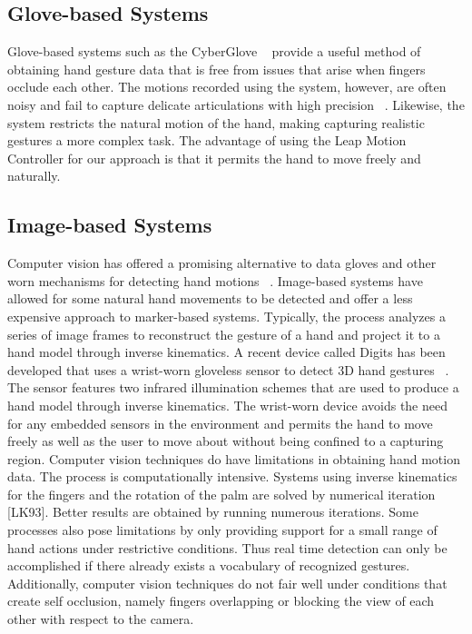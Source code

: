 \documentclass[review]{acmsiggraph}
\begin{document}
\subsection{Glove-based Systems}

Glove-based systems such as the CyberGlove ~\cite{CYB}
provide a useful method of obtaining hand gesture data that
is free from issues that arise when fingers occlude each
other. The motions recorded using the system, however, are
often noisy and fail to capture delicate articulations with
high precision ~\cite{ZCX12}. Likewise, the system restricts the
natural motion of the hand, making capturing realistic gestures
a more complex task. The advantage of using the
Leap Motion Controller for our approach is that it permits
the hand to move freely and naturally.


\subsection{Image-based Systems}

Computer vision has offered a promising alternative to
data gloves and other worn mechanisms for detecting hand
motions ~\cite{EBN07}. Image-based systems have allowed for
some natural hand movements to be detected and offer a
less expensive approach to marker-based systems. Typically,
the process analyzes a series of image frames to reconstruct
the gesture of a hand and project it to a hand model
through inverse kinematics.
A recent device called Digits has been developed that
uses a wrist-worn gloveless sensor to detect 3D hand gestures
~\cite{KHI12}. The sensor features two infrared illumination
schemes that are used to produce a hand model
through inverse kinematics. The wrist-worn device avoids
the need for any embedded sensors in the environment and
permits the hand to move freely as well as the user to move
about without being confined to a capturing region.
Computer vision techniques do have limitations in obtaining
hand motion data. The process is computationally
intensive. Systems using inverse kinematics for the fingers
and the rotation of the palm are solved by numerical iteration
[LK93]. Better results are obtained by running numerous
iterations. Some processes also pose limitations by
only providing support for a small range of hand actions
under restrictive conditions. Thus real time detection can
only be accomplished if there already exists a vocabulary
of recognized gestures. Additionally, computer vision techniques
do not fair well under conditions that create self occlusion,
namely fingers overlapping or blocking the view
of each other with respect to the camera.
\end{document}
